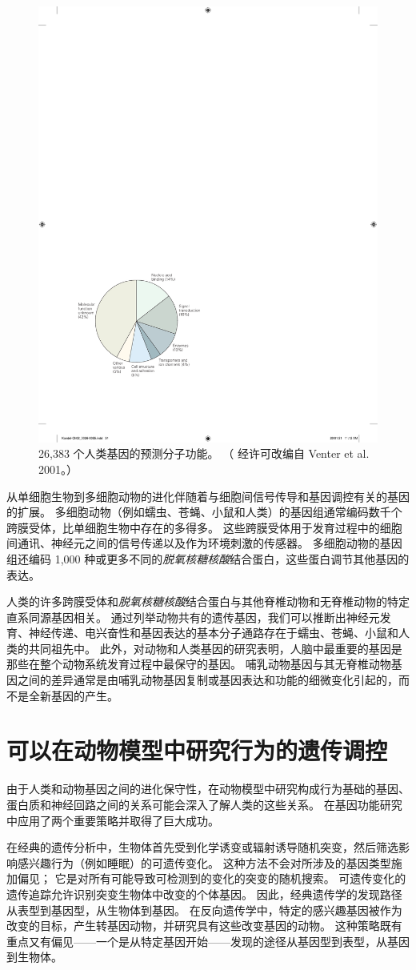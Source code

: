 \begin{figure}[htbp]
	\centering
	\includegraphics[width=0.5\linewidth]{chap02/fig_2_6}
	\caption{26,383 个人类基因的预测分子功能。 （
		经许可改编自 Venter et al. 2001。）}
	\label{fig:2_6}
\end{figure}


从单细胞生物到多细胞动物的进化伴随着与细胞间信号传导和基因调控有关的基因的扩展。 
多细胞动物（例如蠕虫、苍蝇、小鼠和人类）的基因组通常编码数千个跨膜受体，比单细胞生物中存在的多得多。 
这些跨膜受体用于发育过程中的细胞间通讯、神经元之间的信号传递以及作为环境刺激的传感器。 
多细胞动物的基因组还编码 1,000 种或更多不同的\textit{脱氧核糖核酸}结合蛋白，这些蛋白调节其他基因的表达。


人类的许多跨膜受体和\textit{脱氧核糖核酸}结合蛋白与其他脊椎动物和无脊椎动物的特定直系同源基因相关。 
通过列举动物共有的遗传基因，我们可以推断出神经元发育、神经传递、电兴奋性和基因表达的基本分子通路存在于蠕虫、苍蝇、小鼠和人类的共同祖先中。 
此外，对动物和人类基因的研究表明，人脑中最重要的基因是那些在整个动物系统发育过程中最保守的基因。 
哺乳动物基因与其无脊椎动物基因之间的差异通常是由哺乳动物基因复制或基因表达和功能的细微变化引起的，而不是全新基因的产生。


\section{可以在动物模型中研究行为的遗传调控}
由于人类和动物基因之间的进化保守性，在动物模型中研究构成行为基础的基因、蛋白质和神经回路之间的关系可能会深入了解人类的这些关系。 
在基因功能研究中应用了两个重要策略并取得了巨大成功。


在经典的遗传分析中，生物体首先受到化学诱变或辐射诱导随机突变，然后筛选影响感兴趣行为（例如睡眠）的可遗传变化。 
这种方法不会对所涉及的基因类型施加偏见； 
它是对所有可能导致可检测到的变化的突变的随机搜索。 
可遗传变化的遗传追踪允许识别突变生物体中改变的个体基因。 
因此，经典遗传学的发现路径从表型到基因型，从生物体到基因。 
在反向遗传学中，特定的感兴趣基因被作为改变的目标，产生转基因动物，并研究具有这些改变基因的动物。 
这种策略既有重点又有偏见——一个是从特定基因开始——发现的途径从基因型到表型，从基因到生物体。


